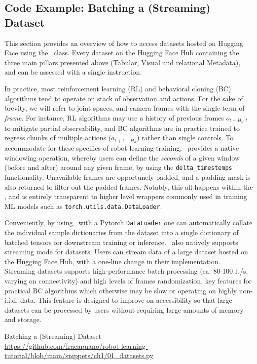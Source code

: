 \subsection{Code Example: Batching a (Streaming) Dataset}

This section provides an overview of how to access datasets hosted on Hugging Face using the \lerobotdataset~class.
Every dataset on the Hugging Face Hub containing the three main pillars presented above (Tabular, Visual and relational Metadata), and can be assessed with a single instruction.

In practice, most reinforcement learning (RL) and behavioral cloning (BC) algorithms tend to operate on stack of observation and actions.
For the sake of brevity, we will refer to joint spaces, and camera frames with the single term of \emph{frame}.
For instance, RL algorithms may use a history of previous frames \(o_{t-H_o:t} \) to mitigate partial observability, and BC algorithms are in practice trained to regress chunks of multiple actions (\(a_{t+t+H_a} \)) rather than single controls.
To accommodate for these specifics of robot learning training, \lerobotdataset~provides a native windowing operation, whereby users can define the \emph{seconds} of a given window (before and after) around any given frame, by using the \texttt{delta\_timestemps} functionality.
Unavailable frames are opportunely padded, and a padding mask is also returned to filter out the padded frames.
Notably, this all happens within the \lerobotdataset, and is entirely transparent to higher level wrappers commonly used in training ML models such as \texttt{torch.utils.data.DataLoader}.

Conveniently, by using \lerobotdataset~with a Pytorch \texttt{DataLoader} one can automatically collate the individual sample dictionaries from the dataset into a single dictionary of batched tensors for downstream training or inference.
\lerobotdataset~also natively supports streaming mode for datasets.
Users can stream data of a large dataset hosted on the Hugging Face Hub, with a one-line change in their implementation.
Streaming datasets supports high-performance batch processing (ca. 80-100 it/s, varying on connectivity) and high levels of frames randomization, key features for practical BC algorithms which otherwise may be slow or operating on highly non-i.i.d. data.
This feature is designed to improve on accessibility so that large datasets can be processed by users without requiring large amounts of memory and storage.

\begin{pbox}[label={ex:dataset-batching}]{Batching a (Streaming) Dataset \\ \url{https://github.com/fracapuano/robot-learning-tutorial/blob/main/snippets/ch1/01_datasets.py}}
    
\end{pbox}

